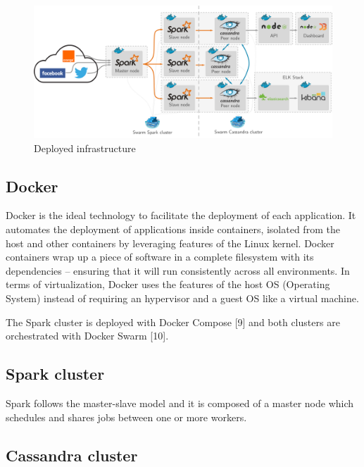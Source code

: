 \documentclass[11pt]{article}
\begin{document}
\begin{figure}[h!]
    \centering
    \includegraphics[scale=0.15]{img/archi.png}
    \caption{Deployed infrastructure}
    \label{infra}
\end{figure}

\subsection{Docker}

\textsf{Docker} is the ideal technology to facilitate the deployment of each application. It automates the deployment of applications inside containers, isolated from the host and other containers by leveraging features of the \textsf{Linux} kernel. \textsf{Docker} containers wrap up a piece of software in a complete filesystem with its dependencies – ensuring that it will run consistently across all environments. In terms of virtualization, \textsf{Docker} uses the features of the host OS (Operating System) instead of requiring an hypervisor and a guest OS like a virtual machine.


The \textsf{Spark} cluster is deployed with \textsf{Docker Compose} [9] and both clusters are orchestrated with \textsf{Docker Swarm} [10].

\subsection{Spark cluster}

\textsf{Spark} follows the master-slave model and it is composed of a master node which schedules and shares jobs between one or more workers.

\subsection{Cassandra cluster}
\end{document}
